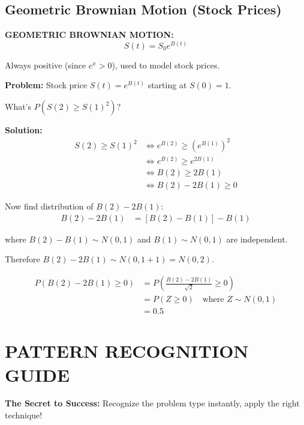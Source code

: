 \documentclass[10pt,letterpaper]{article}
\begin{document}
\subsection{Geometric Brownian Motion (Stock Prices)}

\begin{formulabox}
\textbf{GEOMETRIC BROWNIAN MOTION:}
\[
S(t) = S_0 e^{B(t)}
\]

Always positive (since $e^x > 0$), used to model stock prices.
\end{formulabox}

\begin{examplebox}
\textbf{Problem:} Stock price $S(t) = e^{B(t)}$ starting at $S(0) = 1$.

What's $P(S(2) \geq S(1)^2)$?

\textbf{Solution:}
\begin{align*}
S(2) \geq S(1)^2 &\Leftrightarrow e^{B(2)} \geq (e^{B(1)})^2 \\
&\Leftrightarrow e^{B(2)} \geq e^{2B(1)} \\
&\Leftrightarrow B(2) \geq 2B(1) \\
&\Leftrightarrow B(2) - 2B(1) \geq 0
\end{align*}

Now find distribution of $B(2) - 2B(1)$:
\begin{align*}
B(2) - 2B(1) &= [B(2) - B(1)] - B(1)
\end{align*}

where $B(2) - B(1) \sim N(0,1)$ and $B(1) \sim N(0,1)$ are independent.

Therefore $B(2) - 2B(1) \sim N(0, 1+1) = N(0, 2)$.

\begin{align*}
P(B(2) - 2B(1) \geq 0) &= P\left(\frac{B(2) - 2B(1)}{\sqrt{2}} \geq 0\right) \\
&= P(Z \geq 0) \quad \text{where } Z \sim N(0,1) \\
&= \boxed{0.5}
\end{align*}
\end{examplebox}

\newpage

\section{PATTERN RECOGNITION GUIDE}

\begin{criticalbox}
\textbf{The Secret to Success:} Recognize the problem type instantly, apply the right technique!
\end{criticalbox}
\end{document}
